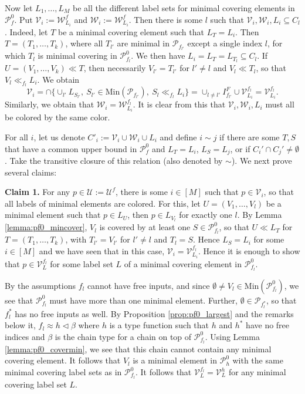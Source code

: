 \documentclass[12pt]{article}
\theoremstyle{definition}
\theoremstyle{remark}
\def\cover{\ll}
\def\Pe{\mathcal P}
\def\vtl{\vartriangleleft}
\begin{document}
Now let $L_1,\dots, L_M$ be all the different label sets for minimal covering elements in
$\Pe_f^0$.  Put $\mathcal V_i:=\mathcal
W^f_{L_i}$ and $\mathcal W_i:=\mathcal W_{L_i}^f$. Then  there is some $l$
such that  $\mathcal V_i, \mathcal W_i,  L_i\subseteq C_l$. Indeed,  let $T$ be a minimal
covering element such that
$L_T=L_i$. Then $T=(T_1,\dots,T_k)$, where all $T_{l'}$ are minimal in $\Pe_{f_{l'}}$ except a
single index $l$, for which $T_{l}$ is minimal covering in $\Pe_{f_{l}}^0$. We then
have $L_i=L_T=L_{T_{l}}\subseteq C_{l}$. If
$U=(V_1,\dots,V_k)\cover T$, then necessarily $V_{l'}=T_{l'}$ for $l'\ne l$ and $V_{l}\cover
T_{l}$, so that $V_{l}\cover_{f_l} L_i$. We obtain 
\[
\mathcal V_i=\cap\{ \cup_{l'} L_{S_{l'}},\ S_{l'}\in \mathrm{Min}(\Pe_{f_{l'}}),\
S_{l}\cover_{f_l}L_i\}=\cup_{l\ne l'} I_{f_{l'}}^F\cup \mathcal
V_{L_i}^{f_l}=\mathcal
V_{L_i}^{f_l}.
\]
Similarly, we obtain that 
$\mathcal W_i=\mathcal W_{L_i}^{f_{l}}$.
 It is clear from this that $\mathcal
V_i,\mathcal W_i,L_i$ must all be colored by the same color. 

For all $i$, let us denote
$C'_i:=\mathcal V_i\cup \mathcal W_i\cup L_i$ and define $i\sim j$ if  there are some
$T,S$ that have a common upper bound in $\Pe_f^0$ and $L_T=L_i$, $L_S=L_j$, or if $C_i'\cap C_j'\ne
\emptyset$. Take the transitive closure of this relation (also denoted by $\sim$).
We next prove several claims:

\medskip
\noindent
\textbf{Claim 1.} For  any $p\in \mathcal U:=\mathcal U^f$, there is some $i\in [M]$ such that $p\in \mathcal
V_i$, so that all labels of minimal elements are colored. For this, 
let $U=(V_1,\dots, V_l)$ be a minimal element such that $p\in L_U$, then $p\in L_{V_l}$ for exactly one
$l$. By Lemma \ref{lemma:pf0_mincover}, $V_l$ is
covered by at least one $S\in \Pe_{f_l}^0$, so that $U\cover L_{T}$ for
$T=(T_1,\dots, T_k)$, with $T_{l'}=V_{l'}$ for $l'\ne l$ and $T_l=S$. Hence $L_S=L_i$  for some $i\in [M]$
and we have seen that in this case, $\mathcal V_i=\mathcal V_{L_i}^{f_l}$.
 Hence it is enough
to show that $p\in \mathcal V_L^{f_l}$ for some label set  $L$ of a  minimal covering element
in $\Pe_{f_l}^0$.  

By the assumptions $f_l$ cannot have free inputs, and since $\emptyset\ne V_l\in
\mathrm{Min}(\Pe^0_{f_l})$, we see that $\Pe_{f_l}^0$ must have more than one minimal
element.  Further, $\emptyset \in \Pe_{f_l^*}$, so that $f_l^*$
has no free inputs as well. By Proposition \ref{prop:pf0_largest} and the remarks below it, $f_l\approx h\vtl \beta$ 
 where  $h$ is a type
 function such that $h$ and $h^*$ have no free indices and $\beta$ is the chain type for a
 chain on top of $\Pe_{f_l}^0$.
Using Lemma \ref{lemma:pf0_covermin}, we see that this chain cannot contain any minimal
covering element. It follows that $V_l$ is a minimal element in $\Pe_h^0$ with the same
minimal covering label sets as in $\Pe_{f_l}^0$.
It follows that $\mathcal V^{f_l}_L=\mathcal V^h_L$ for any minimal covering label set $L$.
\end{document}
